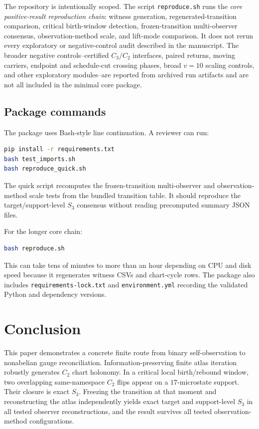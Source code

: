 \documentclass[11pt]{article}
\begin{document}
The repository is intentionally scoped.  The script \texttt{reproduce.sh} runs the \emph{core positive-result reproduction chain}: witness generation, regenerated-transition comparison, critical birth-window detection, frozen-transition multi-observer consensus, observation-method scale, and lift-mode comparison.  It does not rerun every exploratory or negative-control audit described in the manuscript.  The broader negative controls--certified $C_3/C_2$ interfaces, paired returns, moving carriers, endpoint and schedule-cut crossing phases, broad $v=10$ scaling controls, and other exploratory modules--are reported from archived run artifacts and are not all included in the minimal core package.

\subsection*{Package commands}
The package uses Bash-style line continuation.  A reviewer can run:

\begin{lstlisting}[language=bash]
pip install -r requirements.txt
bash test_imports.sh
bash reproduce_quick.sh
\end{lstlisting}

The quick script recomputes the frozen-transition multi-observer and observation-method scale tests from the bundled transition table.  It should reproduce the target/support-level $S_3$ consensus without reading precomputed summary JSON files.

For the longer core chain:

\begin{lstlisting}[language=bash]
bash reproduce.sh
\end{lstlisting}

This can take tens of minutes to more than an hour depending on CPU and disk speed because it regenerates witness CSVs and chart-cycle rows.  The package also includes \texttt{requirements-lock.txt} and \texttt{environment.yml} recording the validated Python and dependency versions.

\section{Conclusion}

This paper demonstrates a concrete finite route from binary self-observation to nonabelian gauge reconciliation.  Information-preserving finite atlas iteration robustly generates $C_2$ chart holonomy.  In a critical local birth/rebound window, two overlapping same-namespace $C_2$ flips appear on a $17$-microstate support.  Their closure is exact $S_3$.  Freezing the transition at that moment and reconstructing the atlas independently yields exact target and support-level $S_3$ in all tested observer reconstructions, and the result survives all tested observation-method configurations.
\end{document}
